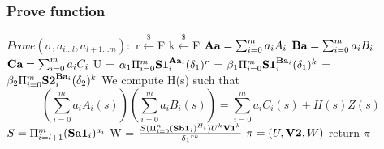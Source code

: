 \subsubsection{Prove function}
\underline{$Prove(\sigma, a_{i...l}, a_{l+1...m}) :$}
\tabNormal r$\xleftarrow[]{\$}$F
\tabNormal k$\xleftarrow[]{\$}$F
\tabNormal $\textbf{Aa} =\sum_{i=0}^m a_i A_i$
\tabNormal $\textbf{Ba}=\sum_{i=0}^m a_i B_i$
\tabNormal $\textbf{Ca} =\sum_{i=0}^m a_i C_i$
\tabNormal U = $\textbf{$\alpha_1$} \Pi_{i=0}^{m} \textbf{S1}_i^{\textbf{Aa}_i} (\textbf{$\delta_1$})^r $
\tabNormal \VOne = $\textbf{$\beta_1$} \Pi_{i=0}^{m} \textbf{S1}_i^{\textbf{Ba}_i} (\textbf{$\delta_1$})^k $
\tabNormal \VTwo = $\textbf{$\beta_2$} \Pi_{i=0}^{m} \textbf{S2}_i^{\textbf{Ba}_i} (\textbf{$\delta_2$})^k $
\tabNormal We compute H(s) such that  \[ (\sum_{i=0}^m a_i A_i(s)) (\sum_{i=0}^m a_i B_i(s)) = \sum_{i=0}^m a_i C_i(s) + H(s) Z(s) \]
\tabNormal $S=\Pi_{i=l+1}^{m}(\textbf{Sa1}_i)^{a_i}$
\tabNormal W = $\frac{S (\Pi_{i=0}^n (\textbf{Sb1}_i)^{H_i}) U^k \textbf{V1}^k}{\textbf{$\delta_1$}^{rk}} $
\tabNormal $\pi = (U,\textbf{V2},W)$
\tabNormal return $\pi$